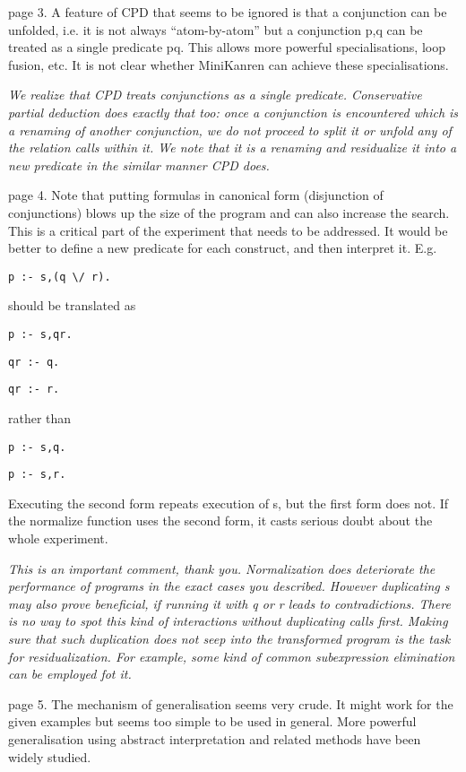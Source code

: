page 3. A feature of CPD that seems to be ignored is that a conjunction can be unfolded, i.e. it is not always ``atom-by-atom'' but a conjunction p,q can be treated as a single predicate pq.  This allows more powerful specialisations, loop fusion, etc.  It is not clear whether MiniKanren can achieve these specialisations.

\emph{We realize that CPD treats conjunctions as a single predicate. Conservative partial deduction does exactly that too: once a conjunction is encountered which is a renaming of another conjunction, we do not proceed to split it or unfold any of the relation calls within it. We note that it is a renaming and residualize it into a new predicate in the similar manner CPD does.}


page 4.  Note that putting formulas in canonical form (disjunction of conjunctions) blows up the size of the program and can also increase the search.  This is a critical part of the experiment that needs to be addressed.  It would be better to define a new predicate for each construct, and then interpret it.  E.g.

\verb!p :- s,(q \/ r).!

should be translated as

\verb!p :- s,qr.!

\verb!qr :- q.!

\verb!qr :- r.!

rather than

\verb!p :- s,q.!

\verb!p :- s,r.!

Executing the second form repeats execution of s, but the first form does not.  If the normalize function uses the second form, it casts serious doubt about the whole experiment.

\emph{This is an important comment, thank you. Normalization does deteriorate the performance of programs in the exact cases you described. However duplicating s may also prove beneficial, if running it with q or r leads to contradictions. There is no way to spot this kind of interactions without duplicating calls first. Making sure that such duplication does not seep into the transformed program is the task for residualization. For example, some kind of common subexpression elimination can be employed fot it. }

page 5.  The mechanism of generalisation seems very crude.  It might work for the given examples but seems too simple to be used in general.  More powerful generalisation using abstract interpretation and related methods have been widely studied.

